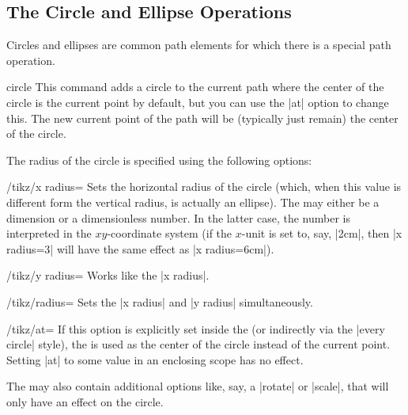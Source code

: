 \subsection{The Circle and Ellipse Operations}

Circles and ellipses are common path elements for which there is a special path
operation.

\begin{pathoperation}{circle}{}
    This command adds a circle to the current path where the center of the
    circle is the current point by default, but you can use the |at| option to
    change this. The new current point of the path will be (typically just
    remain) the center of the circle.

    The radius of the circle is specified using the following options:
    \begin{key}{/tikz/x radius=}
        Sets the horizontal radius of the circle (which, when this value is
        different form the vertical radius, is actually an ellipse). The
         may either be a dimension or a dimensionless number. In
        the latter case, the number is interpreted in the $xy$-coordinate
        system (if the $x$-unit is set to, say, |2cm|, then |x radius=3| will
        have the same effect as |x radius=6cm|).
    \end{key}
    \begin{key}{/tikz/y radius=}
        Works like the |x radius|.
    \end{key}
    \begin{key}{/tikz/radius=}
        Sets the |x radius| and |y radius| simultaneously.
    \end{key}
    \begin{key}{/tikz/at=}
        If this option is explicitly set inside the  (or
        indirectly via the |every circle| style), the  is used
        as the center of the circle instead of the current point. Setting |at|
        to some value in an enclosing scope has no effect.
    \end{key}
    The  may also contain additional options like, say, a
    |rotate| or |scale|, that will only have an effect on the circle.
\begin{codeexample}[]
\end{codeexample}


\end{pathoperation}
